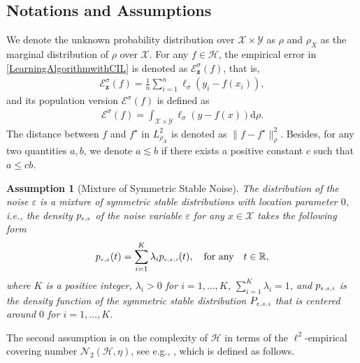 \documentclass[11pt]{article}
\newtheorem{assumption}{Assumption}
\begin{document}
\subsection{Notations and Assumptions}
We denote the unknown probability distribution over $\mathcal{X}\times\mathcal{Y}$ as $\rho$ and $\rho_{X}$ as the marginal distribution of $\rho$ over $\mathcal{X}$. For any $f\in\mathcal{H}$, the empirical error in \eqref{LearningAlgorithmwithCIL} is denoted as $\mathcal{E}_\mathbf{z}^\sigma(f)$, that is,
\begin{align*}
\mathcal{E}_\mathbf{z}^\sigma(f)=\frac{1}{n}\sum_{i=1}^n \ell_\sigma(y_i-f(x_i)),
\end{align*}
and its population version $\mathcal{E}^\sigma(f)$ is defined as
\begin{align*}
\mathcal{E}^\sigma(f)=\int_{\mathcal{X}\times\mathcal{Y}}\ell_\sigma(y-f(x))\mathrm{d}\rho.
\end{align*}   
The distance between $f$ and $f^\star$ in $L_{\rho_X}^2$ is denoted as $\|f-f^\star\|_\rho^2$. Besides, for any two quantities $a,b$, we denote $a\lesssim b$ if there exists a positive constant $c$ such that $a\leq cb$.


\begin{assumption}[Mixture of Symmetric Stable Noise]\label{noise_assumption}
	The distribution of the noise $\varepsilon$ is a mixture of symmetric stable distributions with location parameter $0$, i.e., the density $p_\mathsmaller{\varepsilon,x}$ of the noise variable $\varepsilon$ for any $x\in\mathcal{X}$ takes the following form
	\begin{align*}
	p_\mathsmaller{\varepsilon,x}(t)=\sum_{i=1}^K\lambda_i p_\mathsmaller{\varepsilon,x,i}(t),\quad\hbox{for any}\quad t\in\mathbb{R},
	\end{align*} 
	where $K$ is a positive integer, $\lambda_i>0$ for $i=1,\ldots,K$, $\sum_{i=1}^K\lambda_i=1$, and $p_\mathsmaller{\varepsilon,x,i}$ is the density function of the symmetric stable distribution $P_\mathsmaller{\varepsilon,x,i}$ that is centered around $0$ for $i=1,\ldots,K$.  
\end{assumption}

The second assumption is on the complexity of $\mathcal{H}$ in terms of the $\ell^2$-empirical covering number $\mathcal{N}_2(\mathcal{H},\eta)$, see e.g., \cite{wu2007multi,shi2011concentration,guo2013concentration}, which is defined as follows.
\end{document}
